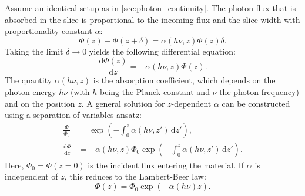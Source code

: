 Assume an identical setup as in \cref{sec:photon_continuity}. The photon flux that
is absorbed in the slice is proportional to the incoming flux and the slice width
with proportionality constant $\alpha$:
\begin{equation}
	\Phi(z) - \Phi(z+\delta) = \alpha(h\nu, z) \Phi(z) \delta.
\end{equation}
Taking the limit $\delta \to 0$ yields the following differential equation:
\begin{equation}
	\frac{\mathrm{d}\Phi(z)}{\mathrm{d}z}=-\alpha(h\nu, z) \Phi(z).
\end{equation}
The quantity $\alpha(h\nu, z)$ is the absorption coefficient, which depends on
the photon energy $h\nu$ (with $h$ being the Planck constant and $\nu$ the photon
frequency) and on the position $z$. A general solution for $z$-dependent $\alpha$
can be constructed using a separation of variables ansatz:
\begin{align}
	\frac{\Phi}{\Phi_{0}}              & = \exp\left( -\int_{0}^{z}\alpha(h \nu, z') \, \mathrm{d}z' \right),                                                 \\
	\frac{\mathrm{d}\Phi}{\mathrm{d}z} & = -\alpha(h\nu, z) \Phi_{0}\exp\left( -\int_{0}^{z}\alpha(h\nu, z') \, \mathrm{d}z' \right). \label{eq:flux_general}
\end{align}
Here, $\Phi_{0}=\Phi(z=0)$ is the incident flux entering the material. If
$\alpha$ is independent of $z$, this reduces to the Lambert-Beer law:
\begin{equation}
	\Phi(z) = \Phi_{0}\exp(-\alpha(h\nu) z). \label{eq:lambert_beer}
\end{equation}